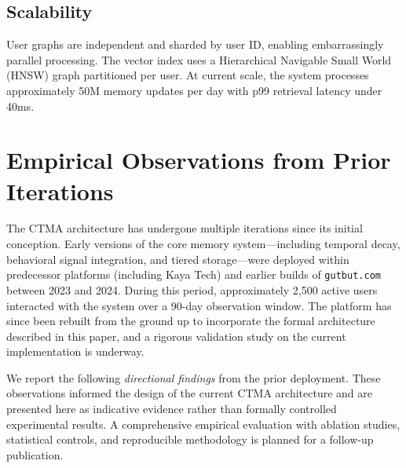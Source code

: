 \documentclass[11pt,a4paper]{article}
\begin{document}
\subsection{Scalability}

User graphs are independent and sharded by user ID, enabling embarrassingly parallel processing. The vector index uses a Hierarchical Navigable Small World (HNSW) graph \citep{malkov2018efficient} partitioned per user. At current scale, the system processes approximately 50M memory updates per day with p99 retrieval latency under 40ms.


\section{Empirical Observations from Prior Iterations}
\label{sec:results}

The CTMA architecture has undergone multiple iterations since its initial conception. Early versions of the core memory system---including temporal decay, behavioral signal integration, and tiered storage---were deployed within predecessor platforms (including Kaya Tech) and earlier builds of \texttt{gutbut.com} between 2023 and 2024. During this period, approximately 2,500 active users interacted with the system over a 90-day observation window. The platform has since been rebuilt from the ground up to incorporate the formal architecture described in this paper, and a rigorous validation study on the current implementation is underway.

We report the following \textit{directional findings} from the prior deployment. These observations informed the design of the current CTMA architecture and are presented here as indicative evidence rather than formally controlled experimental results. A comprehensive empirical evaluation with ablation studies, statistical controls, and reproducible methodology is planned for a follow-up publication.
\end{document}
